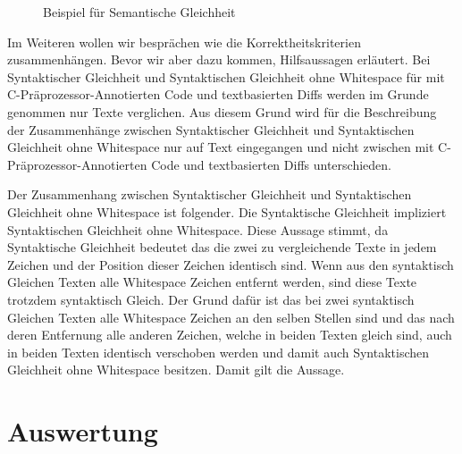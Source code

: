 \begin{figure}[H]
	\caption{Beispiel für Semantische Gleichheit }
\end{figure}


Im Weiteren wollen wir besprächen wie die Korrektheitskriterien zusammenhängen. Bevor wir aber dazu kommen, Hilfsaussagen erläutert. Bei Syntaktischer Gleichheit und Syntaktischen Gleichheit ohne Whitespace für mit C-Präprozessor-Annotierten Code und textbasierten Diffs werden im Grunde genommen nur Texte verglichen. Aus diesem Grund wird für die Beschreibung der Zusammenhänge zwischen Syntaktischer Gleichheit und Syntaktischen Gleichheit ohne Whitespace nur auf Text eingegangen und nicht zwischen mit C-Präprozessor-Annotierten Code und textbasierten Diffs unterschieden.

Der Zusammenhang zwischen Syntaktischer Gleichheit und Syntaktischen Gleichheit ohne Whitespace ist folgender. Die Syntaktische Gleichheit impliziert Syntaktischen Gleichheit ohne Whitespace. Diese Aussage stimmt, da Syntaktische Gleichheit bedeutet das die zwei zu vergleichende Texte in jedem Zeichen und der Position dieser Zeichen identisch sind. Wenn aus den syntaktisch Gleichen Texten alle Whitespace Zeichen entfernt werden, sind diese Texte trotzdem syntaktisch Gleich. Der Grund dafür ist das bei zwei syntaktisch Gleichen Texten alle Whitespace Zeichen an den selben Stellen sind und das nach deren Entfernung alle anderen Zeichen, welche in beiden Texten gleich sind, auch in beiden Texten identisch verschoben werden und damit auch Syntaktischen Gleichheit ohne Whitespace besitzen. Damit gilt die Aussage.

\section{Auswertung}

